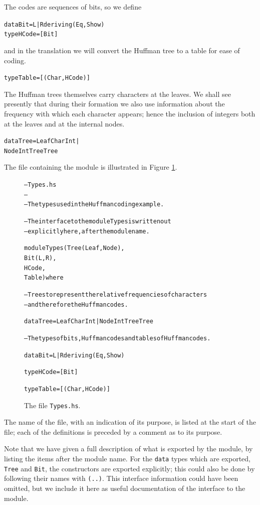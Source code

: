 The codes are sequences of bits, so we define
\begin{alltt}
data Bit   =  L | R deriving (Eq,Show)
type HCode = [Bit]
\end{alltt}
and in the translation we will convert the Huffman tree to a table for ease
of coding.
\begin{alltt}
type Table = [ (Char,HCode) ]
\end{alltt}
The Huffman trees themselves carry characters at the leaves. We shall see
presently that during their formation we also use information about the
frequency with which each character appears; hence the inclusion of 
integers
both at the leaves and at the internal nodes.
\begin{alltt}
data Tree = Leaf Char Int |
            Node Int Tree Tree
\end{alltt}
The file containing the module is illustrated in Figure
\ref{typeMod}.
\begin{figure}
\begin{alltt}
--         Types.hs							
--  
--         The types used in the Huffman coding example.			

-- The interface to the module Types is written out		
-- explicitly here, after the module name.                    	

module Types ( Tree(Leaf,Node), 
               Bit(L,R),  
               HCode , 
               Table  ) where

-- Trees to represent the relative frequencies of characters 	
-- and therefore the Huffman codes.						

data Tree = Leaf Char Int | Node Int Tree Tree

-- The types of bits, Huffman codes and tables of Huffman codes.	

data Bit = L | R deriving (Eq,Show)

type HCode = [Bit]

type Table = [ (Char,HCode) ]
\end{alltt}
\caption{The file \texttt{Types.hs}.}
\label{typeMod}
\end{figure}
The name of the file, with an indication of its purpose, is listed at the 
start of the file; each of the definitions is preceded by a comment as to its
purpose.

Note that we have given a full description of what is exported by the module,
by listing the items after the module name. For the \texttt{data} types which
are exported, \texttt{Tree} and 
\texttt{Bit}, the
constructors are exported explicitly; this could also be done by following their names
with \texttt{(..)}. 
This interface information could have been omitted, but we include it here as useful
documentation of the interface to the module.

